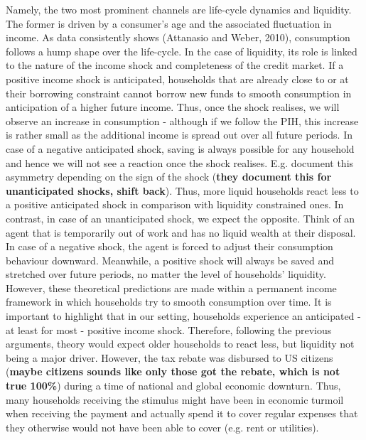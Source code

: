 Namely, the two most prominent channels are life-cycle dynamics and liquidity. The former is driven by a consumer's age and the associated fluctuation in income. As data consistently shows (Attanasio and Weber, 2010), consumption follows a hump shape over the life-cycle. In the case of liquidity, its role is linked to the nature of the income shock and completeness of the credit market. If a positive income shock is anticipated, households that are already close to or at their borrowing constraint cannot borrow new funds to smooth consumption in anticipation of a higher future income. Thus, once the shock realises, we will observe an increase in consumption - although if we follow the PIH, this increase is rather small as the additional income is spread out over all future periods. In case of a negative anticipated shock, saving is always possible for any household and hence we will not see a reaction once the shock realises. E.g. \cite{bunn_etal} document this asymmetry depending on the sign of the shock (\textbf{they document this for unanticipated shocks, shift back}). Thus, more liquid households react less to a positive anticipated shock in comparison with liquidity constrained ones. In contrast, in case of an unanticipated shock, we expect the opposite. Think of an agent that is temporarily out of work and has no liquid wealth at their disposal. In case of a negative shock, the agent is forced to adjust their consumption behaviour downward. Meanwhile, a positive shock will always be saved and stretched over future periods, no matter the level of households' liquidity. However, these theoretical predictions are made within a permanent income framework in which households try to smooth consumption over time. It is important to highlight that in our setting, households experience an anticipated - at least for most - positive income shock. Therefore, following the previous arguments, theory would expect older households to react less, but liquidity not being a major driver. However, the tax rebate was disbursed to US citizens (\textbf{maybe citizens sounds like only those got the rebate, which is not true 100\%}) during a time of national and global economic downturn. Thus, many households receiving the stimulus might have been in economic turmoil when receiving the payment and actually spend it to cover regular expenses that they otherwise would not have been able to cover (e.g. rent or utilities). \\
